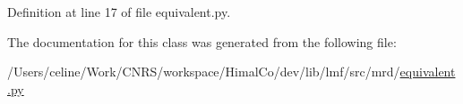 Definition at line 17 of file equivalent.\+py.



The documentation for this class was generated from the following file\+:\begin{DoxyCompactItemize}
\item 
/\+Users/celine/\+Work/\+C\+N\+R\+S/workspace/\+Himal\+Co/dev/lib/lmf/src/mrd/\hyperlink{equivalent_8py}{equivalent.\+py}\end{DoxyCompactItemize}
